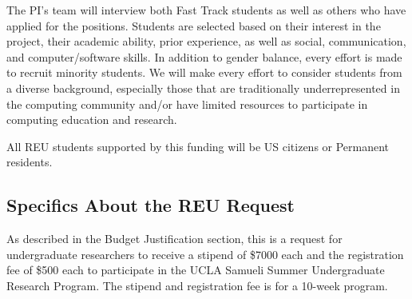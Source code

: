The PI's team will interview both Fast Track students as well as others who have applied for the positions.  
Students are selected based on their interest in the project, their academic ability, prior experience, as well as social, communication, and computer/software skills. 
In addition to gender balance, every effort is made to recruit minority students.
We will make every effort to consider students from a diverse background, especially those that are traditionally underrepresented in the computing community and/or have limited resources to participate in computing education and research.

All REU students supported by this funding will be US citizens or Permanent residents.

\subsection*{Specifics About the REU Request}
As described in the Budget Justification section, this is a request for \numstudents undergraduate researchers to receive a stipend of \$7000 each and the registration fee of \$500 each to participate in the UCLA Samueli Summer Undergraduate Research Program.  
The stipend and registration fee is for a 10-week program.